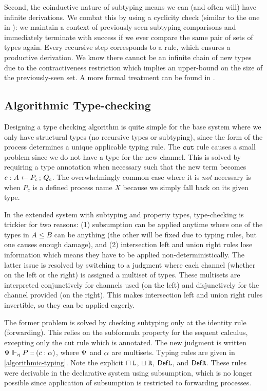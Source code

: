 \documentclass[submission,copyright,creativecommons]{eptcs}
\renewcommand{\intersect}{\mathrel{\sqcap}}
\renewcommand{\union}{\mathrel{\sqcup}}
\newcommand{\m}[1]{\mathsf{#1}}
\begin{document}
Second, the coinductive nature of subtyping means we can (and often will) have infinite derivations. We combat this by using a cyclicity check (similar to the one in \cite{GayH05}): we maintain a context of previously seen subtyping comparisons and immediately terminate with success if we ever compare the same pair of sets of types again. Every recursive step corresponds to a rule, which ensures a productive derivation. We know there cannot be an infinite chain of new types due to the contractiveness restriction which implies an upper-bound on the size of the previously-seen set. A more formal treatment can be found in \cite{Stone05un}.


\subsection{Algorithmic Type-checking}

Designing a type checking algorithm is quite simple for the base system where we only have structural types (no recursive types or subtyping), since the form of the process determines a unique applicable typing rule. The $\cut$ rule causes a small problem since we do not have a type for the new channel. This is solved by requiring a type annotation when necessary such that the new term becomes $\tspawnType c {P_c} A {Q_c}$. The overwhelmingly common case where it is \emph{not} necessary is when $P_c$ is a defined process name $X$ because we simply fall back on its given type.

In the extended system with subtyping and property types, type-checking is trickier for two reasons: (1) subsumption can be applied anytime where one of the types in $A \le B$ can be anything (the other will be fixed due to typing rules, but one causes enough damage), and (2) intersection left and union right rules lose information which means they have to be applied non-deterministically. The latter issue is resolved by switching to a judgment where each channel (whether on the left or the right) is assigned a multiset of types.  These multisets are interpreted conjunctively for channels used (on the left) and disjunctively for the channel provided (on the right). This makes intersection left and union right rules invertible, so they can be applied eagerly.

The former problem is solved by checking subtyping only at the identity rule (forwarding). This relies on the subformula property for the sequent calculus, excepting only the cut rule which is annotated. The new judgment is written $\typeRecAJ P c \typeList$, where $\ctx$ and $\typeList$ are multisets. Typing rules are given in \cref{algorithmic-typing}. Note the explicit $\intersect\Left$, $\union\Right$, $\m{Def}\Left$, and $\m{Def}\Right$. These rules were derivable in the declarative system using subsumption, which is no longer possible since application of subsumption is restricted to forwarding processes.
\end{document}
